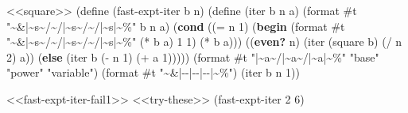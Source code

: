 \documentclass[
]{article}
\newenvironment{Shaded}{}{}
\newcommand{\DecValTok}[1]{\textcolor[rgb]{0.25,0.63,0.44}{#1}}
\newcommand{\ExtensionTok}[1]{#1}
\newcommand{\FunctionTok}[1]{\textcolor[rgb]{0.02,0.16,0.49}{#1}}
\newcommand{\KeywordTok}[1]{\textcolor[rgb]{0.00,0.44,0.13}{\textbf{#1}}}
\newcommand{\NormalTok}[1]{#1}
\newcommand{\OperatorTok}[1]{\textcolor[rgb]{0.40,0.40,0.40}{#1}}
\newcommand{\StringTok}[1]{\textcolor[rgb]{0.25,0.44,0.63}{#1}}
\begin{document}
\hypertarget{fast-expt-iter-fail1}{%
\label{fast-expt-iter-fail1}}%
\begin{Shaded}
\begin{Highlighting}[numbers=left,,]
\NormalTok{\textless{}\textless{}square\textgreater{}\textgreater{}}
\NormalTok{(}\ExtensionTok{define}\FunctionTok{ }\NormalTok{(fast{-}expt{-}iter b n)}
\NormalTok{  (}\ExtensionTok{define}\FunctionTok{ }\NormalTok{(iter b n a)}
\NormalTok{    (format }\DecValTok{\#t} \StringTok{"\textasciitilde{}\&|\textasciitilde{}s\textasciitilde{}/\textasciitilde{}/|\textasciitilde{}s\textasciitilde{}/\textasciitilde{}/|\textasciitilde{}s|\textasciitilde{}\%"}\NormalTok{ b n a)}
\NormalTok{    (}\KeywordTok{cond}\NormalTok{ ((}\OperatorTok{=}\NormalTok{ n }\DecValTok{1}\NormalTok{) (}\KeywordTok{begin}\NormalTok{ (format }\DecValTok{\#t} \StringTok{"\textasciitilde{}\&|\textasciitilde{}s\textasciitilde{}/\textasciitilde{}/|\textasciitilde{}s\textasciitilde{}/\textasciitilde{}/|\textasciitilde{}s|\textasciitilde{}\%"}\NormalTok{ (}\OperatorTok{*}\NormalTok{ b a) }\DecValTok{1} \DecValTok{1}\NormalTok{)}
\NormalTok{                          (}\OperatorTok{*}\NormalTok{ b a)))}
\NormalTok{          ((}\KeywordTok{even?}\NormalTok{ n) (iter (square b)}
\NormalTok{                         (}\OperatorTok{/}\NormalTok{ n }\DecValTok{2}\NormalTok{)}
\NormalTok{                         a))}
\NormalTok{          (}\KeywordTok{else}\NormalTok{ (iter b (}\OperatorTok{{-}}\NormalTok{ n }\DecValTok{1}\NormalTok{) (}\OperatorTok{+}\NormalTok{ a }\DecValTok{1}\NormalTok{)))))}
\NormalTok{  (format }\DecValTok{\#t} \StringTok{"|\textasciitilde{}a\textasciitilde{}/|\textasciitilde{}a\textasciitilde{}/|\textasciitilde{}a|\textasciitilde{}\%"} \StringTok{"base"} \StringTok{"power"} \StringTok{"variable"}\NormalTok{)}
\NormalTok{  (format }\DecValTok{\#t} \StringTok{"\textasciitilde{}\&|{-}{-}|{-}{-}|{-}{-}|\textasciitilde{}\%"}\NormalTok{)}
\NormalTok{  (iter b n }\DecValTok{1}\NormalTok{))}
\end{Highlighting}
\end{Shaded}

\begin{Shaded}
\begin{Highlighting}[numbers=left,,]
\NormalTok{\textless{}\textless{}fast{-}expt{-}iter{-}fail1\textgreater{}\textgreater{}}
\NormalTok{\textless{}\textless{}try{-}these\textgreater{}\textgreater{}}
\NormalTok{(fast{-}expt{-}iter }\DecValTok{2} \DecValTok{6}\NormalTok{)}
\end{Highlighting}
\end{Shaded}
\end{document}
